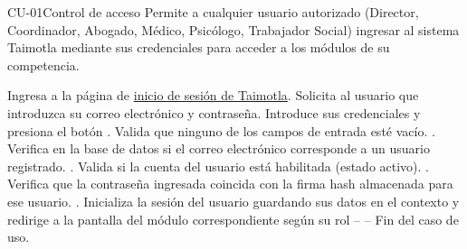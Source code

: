 \begin{UseCase}{CU-01}{Control de acceso}{
	Permite a cualquier usuario autorizado (Director, Coordinador, Abogado, Médico, Psicólogo, Trabajador Social) ingresar al sistema Taimotla mediante sus credenciales para acceder a los módulos de su competencia.
}
\end{UseCase}

\begin{UCtrayectoria}
	\UCpaso[\UCactor] Ingresa a la página de \hyperlink{IU23}{inicio de sesión de Taimotla}.
	\UCpaso Solicita al usuario que introduzca su correo electrónico y contraseña.
	\UCpaso[\UCactor] Introduce sus credenciales y presiona el botón .
	\UCpaso Valida que ninguno de los campos de entrada esté vacío. .
	\UCpaso Verifica en la base de datos si el correo electrónico corresponde a un usuario registrado. .
	\UCpaso Valida si la cuenta del usuario está habilitada (estado activo). .
	\UCpaso Verifica que la contraseña ingresada coincida con la firma hash almacenada para ese usuario. .
	\UCpaso Inicializa la sesión del usuario guardando sus datos en el contexto y redirige a la pantalla del módulo correspondiente según su rol 
	\UCpaso[] -- -- Fin del caso de uso.
\end{UCtrayectoria}

